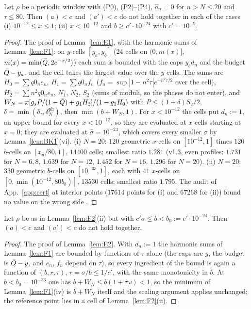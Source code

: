 \begin{lemma} 
\label{lem:F2}
Let $\rho$ be a periodic window with (P0), (P2)--(P4), $\hat a_n=0$ for $n>N\le20$ and $\tau\le80$. Then $(a)<c$ and $(a')<c$ do not hold together in each of the cases
(i) $10^{-12}\le x\le1$; (ii) $x<10^{-12}$ and $b\ge c'\cdot10^{-24}$ with $c'=10^{-9}$.
\end{lemma}
\begin{proof}
The proof of Lemma~\ref{lem:E1}, with the harmonic sums of Lemma~\ref{lem:F1}: on $y$-cells $[y_a,y_b]$ (24 cells on $(0,m(x)]$, $m(x)=\min(\bar Q,2e^{-x/2})$) each sum is
bounded with the caps $y_bd_n$ and the budget $\bar Q-y_a$, and the cell takes the largest value over the $y$-cells. The sums are
$H_0=\sum q0_ne_n$, $H_1=\sum q0_nf_n$ ($f_n=\sup|1-n^2\tau|e^{-n^2\tau/2}$ over the cell), $H_2=\sum n^2q0_ne_n$, $N_1$, $N_2$, $S_2$ (sums of moduli, so the
phases do not enter), and $W_N=x[g_sP/(1-\bar Q)+g_1H_2]/(1-g_1H_0)$ with $P\le(1+\delta)S_2/2$, $\delta=\min(\delta_\tau,\delta_N^{\mathrm{ph}})$, then $\min(b+W_N,1)$.
For $x<10^{-12}$ the cells put $d_n:=1$, an upper bound for every $x<10^{-12}$, so they are evaluated at $x$-cells starting at $x=0$; they are
evaluated at $\hat\sigma=10^{-24}$, which covers every smaller $\sigma$ by Lemma~\ref{lem:BK1}(vi).
(i) $N=20$: $120$ geometric $x$-cells on $[10^{-12},1]$ times $120$ $b$-cells on $[x_a/80,1]$, $14400$ cells; smallest ratio $1.281$
(v1.3, even profiles: $1.731$ for $N=6,8$, $1.639$ for $N=12$, $1.452$ for $N=16$, $1.296$ for $N=20$).
(ii) $N=20$: $330$ geometric $b$-cells on $[10^{-33},1]$, each with $41$ $x$-cells on $[0,\min(10^{-12},80b_b)]$, $13530$ cells; smallest ratio $1.795$.
The audit of App.~\ref{app:cert} at interior points ($17614$ points for (i) and $67268$ for (ii)) found no value on the wrong side \numst.
\end{proof}

\begin{lemma} \proofst
\label{lem:F3}
Let $\rho$ be as in Lemma~\ref{lem:F2}(ii) but with $c'\sigma\le b<b_0:=c'\cdot10^{-24}$. Then $(a)<c$ and $(a')<c$ do not hold together.
\end{lemma}
\begin{proof}
The proof of Lemma~\ref{lem:E2}. With $d_n:=1$ the harmonic sums of Lemma~\ref{lem:F1} are bounded by functions of $\tau$ alone (the caps are $y$, the budget is
$\bar Q-y$, and $e_n$, $f_n$ depend on $\tau$), so every ingredient of the bound is again a function of $(b,r,\tau)$, $r=\sigma/b\le1/c'$, with the same
monotonicity in $b$. At $b<b_0=10^{-33}$ one has $b+W_N\le b(1+\tau\omega)<1$, so the minimum of Lemma~\ref{lem:F1}(iv) is $b+W_N$ itself and the scaling
argument applies unchanged; the reference point lies in a cell of Lemma~\ref{lem:F2}(ii).
\end{proof}

